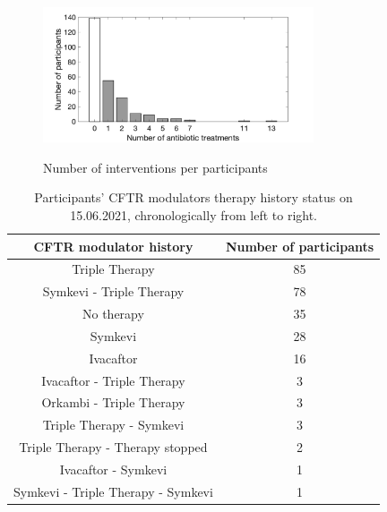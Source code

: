 \begin{appendices}
\begin{figure}[!htb]
\begin{minipage}{0.48\textwidth}
    \caption{Number of interventions per participants}
    \centering
    \includegraphics[width=80mm]{images/bar_intrperpatient_before_filter.png}
    \label{fig:nintr}
    
   \end{minipage}
\end{figure}

    
    \begin{table}[]
        \centering
        \begin{tabular}{c|c}
        \hline
             \textbf{CFTR modulator history} & \textbf{Number of participants} \\
             \hline
             Triple Therapy & 85 \\
             Symkevi - Triple Therapy & 78 \\
             No therapy & 35 \\
             Symkevi & 28 \\
             Ivacaftor & 16 \\
             Ivacaftor - Triple Therapy & 3 \\
             Orkambi - Triple Therapy & 3 \\
             Triple Therapy - Symkevi & 3 \\
             Triple Therapy - Therapy stopped & 2 \\
             Ivacaftor - Symkevi & 1 \\
             Symkevi - Triple Therapy - Symkevi & 1 \\
             \hline
        \end{tabular}
        \caption{Participants' CFTR modulators therapy history status on 15.06.2021, chronologically from left to right. }
        \label{tab:cftrmodulators}
    \end{table}

\begin{table}
\begin{tabular}{l|l|l} 

\hline


\end{tabular}
\end{table}
\end{appendices}
